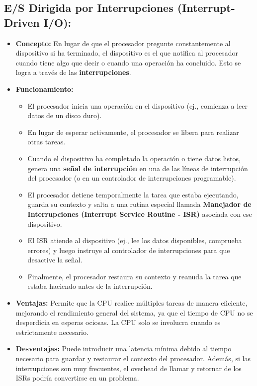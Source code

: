 \documentclass[12pt, a4paper]{article}
\begin{document}
\subsection*{E/S Dirigida por Interrupciones (Interrupt-Driven I/O):}
\begin{itemize}
    \item \textbf{Concepto:} En lugar de que el procesador pregunte constantemente al dispositivo si ha terminado, el dispositivo es el que notifica al procesador cuando tiene algo que decir o cuando una operación ha concluido. Esto se logra a través de las \textbf{interrupciones}.
    \item \textbf{Funcionamiento:}
    \begin{itemize}
        \item El procesador inicia una operación en el dispositivo (ej., comienza a leer datos de un disco duro).
        \item En lugar de esperar activamente, el procesador se libera para realizar otras tareas.
        \item Cuando el dispositivo ha completado la operación o tiene datos listos, genera una \textbf{señal de interrupción} en una de las líneas de interrupción del procesador (o en un controlador de interrupciones programable).
        \item El procesador detiene temporalmente la tarea que estaba ejecutando, guarda su contexto y salta a una rutina especial llamada \textbf{Manejador de Interrupciones (Interrupt Service Routine - ISR)} asociada con ese dispositivo.
        \item El ISR atiende al dispositivo (ej., lee los datos disponibles, comprueba errores) y luego instruye al controlador de interrupciones para que desactive la señal.
        \item Finalmente, el procesador restaura su contexto y reanuda la tarea que estaba haciendo antes de la interrupción.
    \end{itemize}
    \item \textbf{Ventajas:} Permite que la CPU realice múltiples tareas de manera eficiente, mejorando el rendimiento general del sistema, ya que el tiempo de CPU no se desperdicia en esperas ociosas. La CPU solo se involucra cuando es estrictamente necesario.
    \item \textbf{Desventajas:} Puede introducir una latencia mínima debido al tiempo necesario para guardar y restaurar el contexto del procesador. Además, si las interrupciones son muy frecuentes, el overhead de llamar y retornar de los ISRs podría convertirse en un problema.
\end{itemize}
\end{document}
